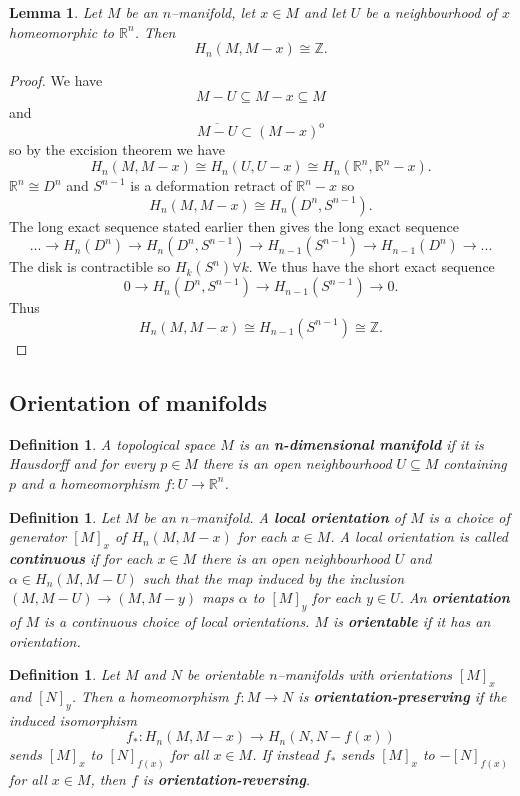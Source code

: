 \documentclass{article}
\newtheorem{definition}[theorem]{Definition}
\newtheorem{lemma}[theorem]{Lemma}
\begin{document}
\begin{lemma}
Let $M$ be an $n$--manifold, let $x\in M$ and let $U$ be a neighbourhood of $x$ homeomorphic to $\mathbb{R}^n$. Then \[H_n(M,M-x)\cong\mathbb{Z}.\]
\end{lemma}
\begin{proof}
We have \[M-U\subseteq M-x\subseteq M\] and \[\overline{M-U}\subset(M-x)^{\mathrm{o}}\] so by the excision theorem we have \[H_n(M,M-x)\cong H_n(U,U-x)\cong H_n(\mathbb{R}^n,\mathbb{R}^n-x).\] $\mathbb{R}^n\cong D^n$ and $S^{n-1}$ is a deformation retract of $\mathbb{R}^n-x$ so \[H_n(M,M-x)\cong H_n(D^n,S^{n-1}).\] The long exact sequence stated earlier then gives the long exact sequence \[...\to H_n(D^n)\to H_n(D^n,S^{n-1})\to H_{n-1}(S^{n-1})\to H_{n-1}(D^n)\to...\] The disk is contractible so $H_k(S^n)\forall k$. We thus have the short exact sequence \[0\to H_n(D^n,S^{n-1})\to H_{n-1}(S^{n-1})\to 0.\] Thus \[H_n(M,M-x)\cong H_{n-1}(S^{n-1})\cong\mathbb{Z}.\]
\end{proof}

\subsection{Orientation of manifolds}
\begin{definition}
A topological space $M$ is an \textbf{n-dimensional manifold} if it is Hausdorff and for every $p\in M$ there is an open neighbourhood $U\subseteq M$ containing $p$ and a homeomorphism $f\colon U\to \mathbb{R}^n$.
\end{definition}

\begin{definition}
Let $M$ be an $n$--manifold. A \textbf{local orientation} of $M$ is a choice of generator $[M]_x$ of $H_n(M,M-x)$ for each $x\in M$. A local orientation is called \textbf{continuous} if for each $x\in M$ there is an open neighbourhood $U$ and $\alpha\in H_n(M,M-U)$ such that the map induced by the inclusion $(M,M-U)\to(M,M-y)$ maps $\alpha$ to $[M]_y$ for each $y\in U$. An \textbf{orientation} of $M$ is a continuous choice of local orientations. $M$ is \textbf{orientable} if it has an orientation.
\end{definition}

\begin{definition}
Let $M$ and $N$ be orientable $n$--manifolds with orientations $[M]_x$ and $[N]_y$. Then a homeomorphism $f:M\to N$ is \textbf{orientation-preserving} if the induced isomorphism \[f_*:H_n(M,M-x)\to H_n(N,N-f(x))\] sends $[M]_x$ to $[N]_{f(x)}$ for all $x\in M$. If instead $f_*$ sends $[M]_x$ to $-[N]_{f(x)}$ for all $x\in M$, then $f$ is \textbf{orientation-reversing}.
\end{definition}
\end{document}

